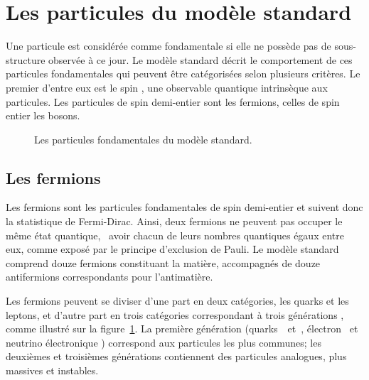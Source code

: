 \section{Les particules du modèle standard}\label{chapter-MS-MSSM-section-SM_ptcs}
Une particule est considérée comme fondamentale si elle ne possède pas de sous-structure observée à ce jour. %
Le modèle standard décrit le comportement de ces particules fondamentales qui peuvent être catégorisées selon plusieurs critères.
Le premier d'entre eux est le \og spin \fg, une observable quantique intrinsèque aux particules.
Les particules de spin demi-entier sont les fermions, celles de spin entier les bosons.
\begin{figure}[h]
\centering
\ifdefined\homedir \else {}\fi
{}
\caption{Les particules fondamentales du modèle standard.}
\label{fig-MS-table}
\end{figure}

\subsection{Les fermions}\label{chapter-MS-MSSM-section-SM_ptcs-subsec-fermions}
Les fermions sont les particules fondamentales de spin demi-entier et suivent donc la statistique de Fermi-Dirac.
Ainsi, deux fermions ne peuvent pas occuper le même état quantique, \ie\ avoir chacun de leurs nombres quantiques égaux entre eux, comme exposé par le principe d'exclusion de Pauli.
Le modèle standard comprend douze fermions constituant la matière, accompagnés de douze antifermions correspondants pour l'antimatière.
\par Les fermions peuvent se diviser d'une part en deux catégories, les quarks et les leptons, et d'autre part en trois catégories correspondant à trois \og générations \fg, comme illustré sur la figure~\ref{fig-MS-table}. La première génération (quarks~\quarku\ et~\quarkd, électron \electron\ et neutrino électronique \nuele) correspond aux particules les plus communes; les deuxièmes et troisièmes générations contiennent des particules analogues, plus massives et instables.

